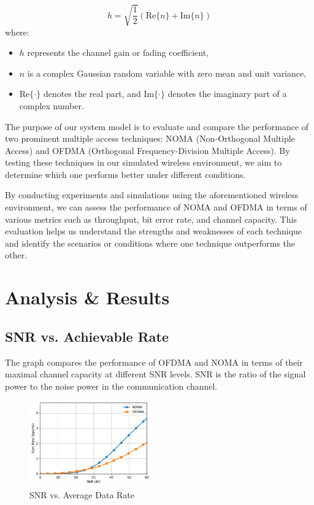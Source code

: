 \documentclass[conference]{IEEEtran}
\begin{document}
$$
h = \sqrt{\frac{1}{2}} \left( \text{Re}\{n\} + \text{Im}\{n\} \right)
$$
where:
\begin{itemize}
  \item $h$ represents the channel gain or fading coefficient,
  \item $n$ is a complex Gaussian random variable with zero mean and unit variance,
  \item $\text{Re}\{\cdot\}$ denotes the real part, and $\text{Im}\{\cdot\}$ denotes the imaginary part of a complex number.
\end{itemize}

The purpose of our system model is to evaluate and compare the performance of two prominent multiple access techniques: NOMA (Non-Orthogonal Multiple Access) and OFDMA (Orthogonal Frequency-Division Multiple Access). By testing these techniques in our simulated wireless environment, we aim to determine which one performs better under different conditions.

By conducting experiments and simulations using the aforementioned wireless environment, we can assess the performance of NOMA and OFDMA in terms of various metrics such as throughput, bit error rate, and channel capacity. This evaluation helps us understand the strengths and weaknesses of each technique and identify the scenarios or conditions where one technique outperforms the other.

\section{Analysis \& Results}

\subsection{SNR vs. Achievable Rate}
The graph compares the performance of OFDMA and NOMA in terms of their maximal channel capacity at different SNR levels. SNR is the ratio of the signal power to the noise power in the communication channel.

\begin{figure}[t!]
    \centering
    \includegraphics[width=0.47\textwidth , height= 0.35\textwidth]{figures/noma_vs_ofdma.pdf}
    \caption{SNR vs. Average Data Rate}
\end{figure}
\end{document}
